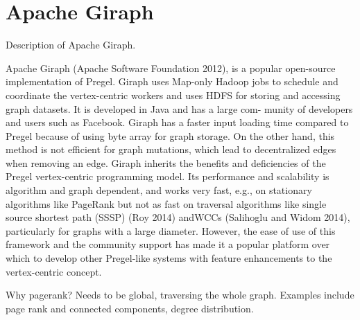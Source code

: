\section{Apache Giraph}
\label{sec:giraph}

Description of Apache Giraph\cite{ApacheGiraph}.

Apache Giraph (Apache Software Foundation 2012), is a popular open-source implementation of
Pregel. Giraph uses Map-only Hadoop jobs to schedule and coordinate the 
vertex-centric workers and uses HDFS for storing and accessing graph datasets. 
It is developed in Java and has a large com- munity of developers and 
users such as Facebook\cite{GiraphAtFacebook}. 
Giraph has a faster input loading time compared to Pregel 
because of using byte array for graph storage. On the other hand, this method 
is not efficient for graph mutations, which lead to decentralized edges when removing an edge. 
Giraph inherits the benefits and deficiencies of the Pregel vertex-centric
programming model. Its performance and scalability is algorithm and graph dependent, 
and works very fast, e.g., on stationary algorithms like PageRank but not as fast on 
traversal algorithms like single source shortest path (SSSP) (Roy 2014) andWCCs 
(Salihoglu and Widom 2014), particularly for graphs with a large diameter. 
However, the ease of use of this framework and the community support has made it a 
popular platform over which to develop other Pregel-like systems with feature enhancements 
to the vertex-centric concept.


Why pagerank?
Needs to be global, traversing the whole graph. Examples include page rank and connected
components, degree distribution.
